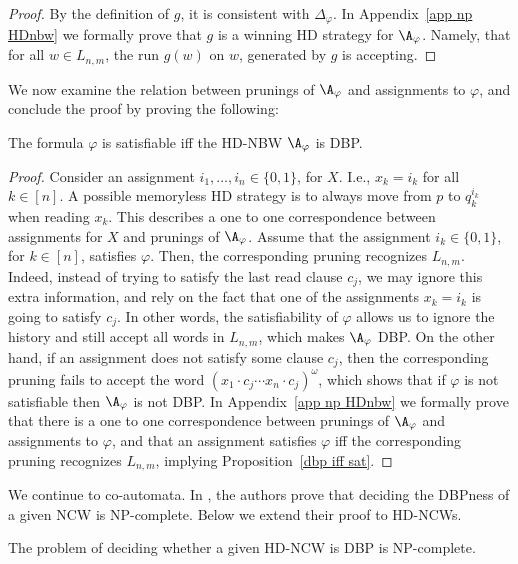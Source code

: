\documentclass{lmcs}
\begin{document}
\begin{proof}
	By the definition of $g$, it is consistent with $\Delta_\varphi$. In Appendix~\ref{app np HDnbw} we formally prove that $g$ is a winning HD strategy for $\A_\varphi$. Namely, that for all $w\in L_{n,m}$, the run $g(w)$ on $w$, generated by $g$ is accepting.
\end{proof}

We now examine the relation between prunings of $\A_\varphi$ and assignments to $\varphi$, and conclude the proof by proving the following:

\begin{prop}\label{dbp iff sat}
		The formula $\varphi$ is satisfiable iff the HD-NBW $\A_\varphi$ is DBP.
\end{prop}

\begin{proof}
Consider an assignment $i_1,\ldots,i_n\in \{0,1\}$, for $X$. I.e., $x_k=i_k$ for all $k\in[n]$. A possible memoryless HD strategy is to always move from $p$ to $q^{i_k}_k$ when reading $x_k$. This describes a one to one correspondence between assignments for $X$ and prunings of $\A_\varphi$. Assume that the assignment $i_k\in \{0,1\}$, for $k\in [n]$, satisfies $\varphi$. Then, the corresponding pruning recognizes $L_{n,m}$. Indeed, instead of trying to satisfy the last read clause $c_j$, we may ignore this extra information, and rely on the fact that one of the assignments $x_k=i_k$ is going to satisfy $c_j$. In other words, the satisfiability of $\varphi$ allows us to ignore the history and still accept all words in $L_{n,m}$, which makes $\A_\varphi$ DBP. On the other hand, if an assignment does not satisfy some clause $c_j$, then the corresponding pruning fails to accept the word $(x_1\cdot c_j\cdots x_n\cdot c_j)^\omega$, which shows that if $\varphi$ is not satisfiable then $\A_\varphi$ is not DBP. In Appendix~\ref{app np HDnbw} we formally prove that there is a one to one correspondence between prunings of $\A_\varphi$ and assignments to $\varphi$, and that an assignment satisfies $\varphi$ iff the corresponding pruning recognizes $L_{n,m}$, implying Proposition~\ref{dbp iff sat}.
\end{proof}


We continue to co-\buchi automata. In \cite{KM18}, the authors prove that deciding the DBPness of a given NCW is NP-complete. Below we extend their proof to HD-NCWs.

\begin{thm}\label{NPC coBuchi DBP}
	The problem of deciding whether a given HD-NCW is DBP is NP-complete.
\end{thm}
\end{document}
